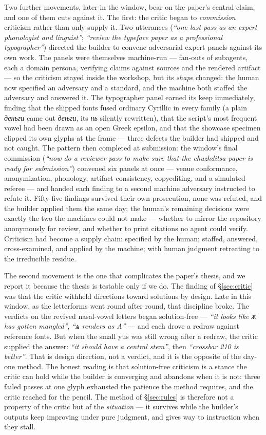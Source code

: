 \documentclass[12pt]{article}
\newcommand{\cz}[1]{{\chu #1}}
\begin{document}
Two further movements, later in the window, bear on the paper's central claim, and one of them cuts against it. The first: the critic began to \emph{commission} criticism rather than only supply it. Two utterances (\emph{``one last pass as an expert phonologist and linguist''}; \emph{``review the typeface paper as a professional typographer''}) directed the builder to convene adversarial expert panels against its own work. The panels were themselves machine-run — fan-outs of subagents, each a domain persona, verifying claims against sources and the rendered artifact — so the criticism stayed inside the workshop, but its \emph{shape} changed: the human now specified an adversary and a standard, and the machine both staffed the adversary and answered it. The typographer panel earned its keep immediately, finding that the shipped fonts fused ordinary Cyrillic in every family (a plain \emph{деньги} came out \emph{дењги}, its \emph{нь} silently rewritten), that the script's most frequent vowel had been drawn as an open Greek epsilon, and that the showcase specimen clipped its own glyphs at the frame — three defects the builder had shipped and not caught. The pattern then completed at submission: the window's final commission (\emph{``now do a reviewer pass to make sure that the chuzhditsa paper is ready for submission''}) convened six panels at once — venue conformance, anonymization, phonology, artifact consistency, copyediting, and a simulated referee — and handed each finding to a second machine adversary instructed to refute it. Fifty-five findings survived their own prosecution, none was refuted, and the builder applied them the same day; the human's remaining decisions were exactly the two the machines could not make — whether to mirror the repository anonymously for review, and whether to print citations no agent could verify. Criticism had become a supply chain: specified by the human; staffed, answered, cross-examined, and applied by the machine; with human judgment retreating to the irreducible residue.

The second movement is the one that complicates the paper's thesis, and we report it because the thesis is testable only if we do. The finding of \S\ref{sec:critic} was that the critic withheld directions toward solutions by design. Late in this window, as the letterforms went round after round, that discipline broke. The verdicts on the revived nasal-vowel letters began solution-free — \emph{``it looks like \cz{ѫ} has gotten mangled''}, \emph{``\cz{ѧ} renders as A''} — and each drove a redraw against reference fonts. But when the small yus was still wrong after a redraw, the critic supplied the answer: \emph{``it should have a central stem''}, then \emph{``crossbar 210 is better''}. That is design direction, not a verdict, and it is the opposite of the day-one method. The honest reading is that solution-free criticism is a stance the critic can hold while the builder is converging and abandons when it is not: three failed passes at one glyph exhausted the patience the method requires, and the critic reached for the pencil. The method of \S\ref{sec:rules} is therefore not a property of the critic but of the \emph{situation} — it survives while the builder's outputs keep improving under pure judgment, and gives way to instruction when they stall.
\end{document}
